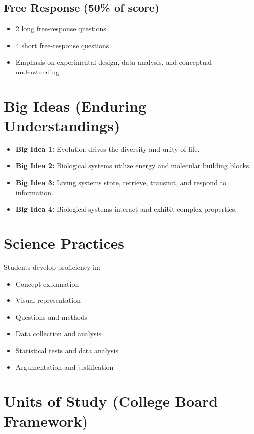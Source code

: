 \documentclass[12pt,oneside]{book}
\begin{document}
\subsection*{Free Response (50\% of score)}
\begin{itemize}[leftmargin=2em]
    \item 2 long free-response questions
    \item 4 short free-response questions
    \item Emphasis on experimental design, data analysis, and conceptual understanding
\end{itemize}

\section{Big Ideas (Enduring Understandings)}
\begin{itemize}[leftmargin=2em]
    \item \textbf{Big Idea 1:} Evolution drives the diversity and unity of life.
    \item \textbf{Big Idea 2:} Biological systems utilize energy and molecular building blocks.
    \item \textbf{Big Idea 3:} Living systems store, retrieve, transmit, and respond to information.
    \item \textbf{Big Idea 4:} Biological systems interact and exhibit complex properties.
\end{itemize}

\section{Science Practices}
Students develop proficiency in:
\begin{itemize}[leftmargin=2em]
    \item Concept explanation
    \item Visual representation
    \item Questions and methods
    \item Data collection and analysis
    \item Statistical tests and data analysis
    \item Argumentation and justification
\end{itemize}

\section{Units of Study (College Board Framework)}
\end{document}
